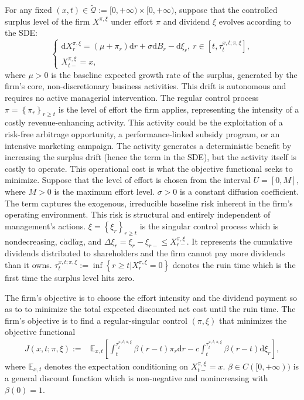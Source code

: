 \documentclass[11pt,reqno]{article}%
\numberwithin{equation}{section}
\begin{document}
For any fixed $(x,t)\in \mathcal{\tilde{Q}}:=[0,+\infty)\times[0,+\infty)$, suppose that the controlled surplus level of the firm $X^{\pi,\xi}$ under effort $\pi$ and dividend $\xi$ evolves according to the SDE:
\begin{equation}
\left\{\begin{array}{l}
\mathrm{d}X^{\pi,\xi}_{r}=\left(\mu+\pi_r\right)\mathrm{d}r+\sigma\mathrm{d}B_{r}-\mathrm{d}\xi_{r},\ r\in[t,\tau^{x,t;\pi,\xi}_{t}],\\
X^{\pi,\xi}_{t-}=x,
\end{array}\right.\nonumber
\end{equation}
where $\mu > 0$ is the baseline expected growth rate of the surplus, generated by the firm's core, non-discretionary business activities. This drift is autonomous and requires no active managerial intervention.  The regular control process $\pi=\left\{\pi_r\right\}_{r\ge t}$ is the level of effort the firm applies, representing the intensity of a costly revenue-enhancing activity. This activity could be the exploitation of a risk-free arbitrage opportunity, a performance-linked subsidy program, or an intensive marketing campaign. The activity generates a deterministic benefit by increasing the surplus drift (hence the term in the SDE), but the activity itself is costly to operate. This operational cost is what the objective functional seeks to minimize. Suppose that the level of effort is chosen from the interval $U=[0,M]$, where $M>0$ is the maximum effort level. $\sigma > 0$ is a constant diffusion coefficient. The term captures the exogenous, irreducible baseline risk inherent in the firm's operating environment. This risk is structural and entirely independent of management's actions. $\xi=\left\{\xi_r\right\}_{r\ge t}$ is the singular control process which is nondecreasing, c$\acute{a}$dl$\acute{a}$g, and $\Delta \xi_r=\xi_r-\xi_{r-}\le X_{r-}^{\pi,\xi}$. It represents the cumulative dividends distributed to shareholders and the firm cannot pay more dividends than it owns. $\tau^{x,t;\pi,\xi}_{t}:=\inf\left\{r\ge t|X^{\pi,\xi}_{r}= 0\right\}$ denotes the ruin time which is the first time the surplus level hits zero.

The firm's objective is to choose the effort intensity and the dividend payment so as to to minimize the total expected discounted net cost until the ruin time. The firm's objective is to find a regular-singular control $(\pi,\xi)$ that minimizes the objective functional
\begin{equation}
\begin{aligned}
J(x, t; \pi,\xi):=&\mathbb{E}_{x, t}\left[\int_t^{\tau^{x,t;\pi,\xi}_{t}} \beta(r-t)\pi_r\mathrm{d}r -c\int_t^{\tau^{x,t;\pi,\xi}_{t}} \beta(r-t)  \mathrm{d} \xi_r\right],
\end{aligned}\label{objexmple}
\end{equation}
where $\mathbb{E}_{x, t}$ denotes the expectation conditioning on $X^{\pi,\xi}_{t-}=x$. $\beta\in C([0,+\infty))$ is a general discount function which is non-negative and nonincreasing with $\beta(0)=1$. 
\end{document}
